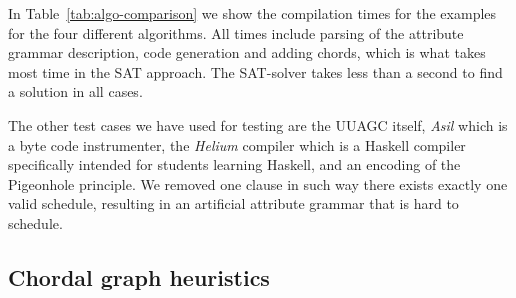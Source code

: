\documentclass{llncs}
\newcommand{\tabref}[1]{Table~\ref{#1}}
\begin{document}
In \tabref{tab:algo-comparison} we show the compilation times for the examples for the four different algorithms. All times include parsing of the attribute grammar description, code generation and adding chords, which is what takes most time in the SAT approach. The SAT-solver takes less than a second to find a solution in all cases.

The other test cases we have used for testing are the UUAGC itself, \emph{Asil} \cite{asil} which is a byte code instrumenter, the \emph{Helium} compiler \cite{helium} which is a Haskell compiler specifically intended for students learning Haskell, and an encoding of the Pigeonhole principle. We removed one clause in such way there exists exactly one valid schedule, resulting in an artificial attribute grammar that is hard to schedule.

\subsection{Chordal graph heuristics} \label{sect:heuristics}
\end{document}
